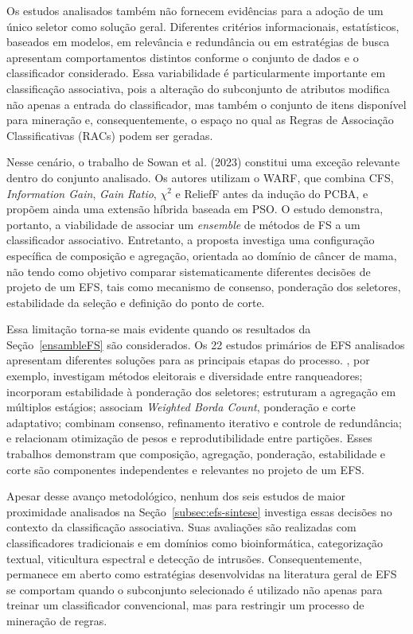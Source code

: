 Os estudos analisados também não fornecem evidências para a adoção de um único
seletor como solução geral. Diferentes critérios informacionais, estatísticos,
baseados em modelos, em relevância e redundância ou em estratégias de busca
apresentam comportamentos distintos conforme o conjunto de dados e o
classificador considerado. Essa variabilidade é particularmente importante em
classificação associativa, pois a alteração do subconjunto de atributos modifica
não apenas a entrada do classificador, mas também o conjunto de itens disponível
para mineração e, consequentemente, o espaço no qual as Regras de Associação
Classificativas (RACs) podem ser geradas.

Nesse cenário, o trabalho de Sowan et al. (2023) constitui uma exceção relevante
dentro do conjunto analisado. Os autores utilizam o WARF, que combina CFS,
\textit{Information Gain}, \textit{Gain Ratio}, $\chi^2$ e ReliefF antes da
indução do PCBA, e propõem ainda uma extensão híbrida baseada em PSO. O estudo
demonstra, portanto, a viabilidade de associar um \textit{ensemble} de métodos de
FS a um classificador associativo. Entretanto, a proposta investiga uma
configuração específica de composição e agregação, orientada ao domínio de câncer
de mama, não tendo como objetivo comparar sistematicamente diferentes decisões de
projeto de um EFS, tais como mecanismo de consenso, ponderação dos seletores,
estabilidade da seleção e definição do ponto de corte.

Essa limitação torna-se mais evidente quando os resultados da Seção~\ref{ensambleFS}
são considerados. Os 22 estudos primários de EFS analisados apresentam diferentes
soluções para as principais etapas do processo. ,
por exemplo, investigam métodos eleitorais e diversidade entre ranqueadores;
 incorporam estabilidade à ponderação dos
seletores;  estruturam a agregação em múltiplos
estágios;  associam \textit{Weighted Borda
Count}, ponderação e corte adaptativo;  combinam
consenso, refinamento iterativo e controle de redundância; e
 relacionam otimização de pesos e
reprodutibilidade entre partições. Esses trabalhos demonstram que composição,
agregação, ponderação, estabilidade e corte são componentes independentes e
relevantes no projeto de um EFS.

Apesar desse avanço metodológico, nenhum dos seis estudos de maior proximidade
analisados na Seção~\ref{subsec:efs-sintese} investiga essas decisões no contexto
da classificação associativa. Suas avaliações são realizadas com classificadores
tradicionais e em domínios como bioinformática, categorização textual,
viticultura espectral e detecção de intrusões. Consequentemente, permanece em
aberto como estratégias desenvolvidas na literatura geral de EFS se comportam
quando o subconjunto selecionado é utilizado não apenas para treinar um
classificador convencional, mas para restringir um processo de mineração de
regras.

